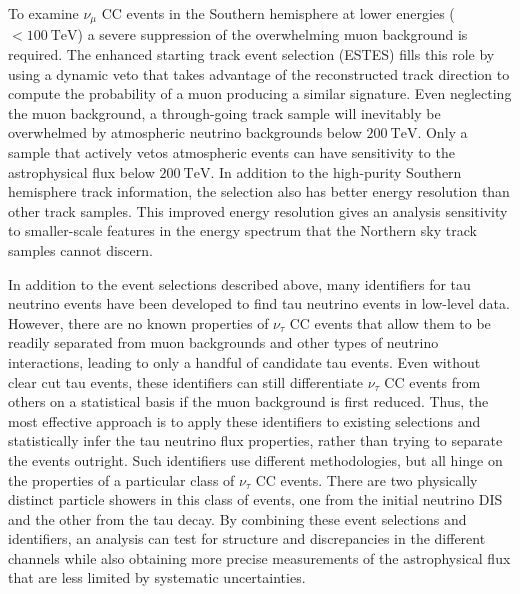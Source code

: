 To examine $\nu_\mu$ CC events in the Southern hemisphere at lower energies ($<\SI{100}\TeV$) a severe suppression of the overwhelming muon background is required.
The enhanced starting track event selection (ESTES) fills this role by using a dynamic veto that takes advantage of the reconstructed track direction to compute the probability of a muon producing a similar signature.
Even neglecting the muon background, a through-going track sample will inevitably be overwhelmed by atmospheric neutrino backgrounds below $\SI{200}\TeV$.
Only a sample that actively vetos atmospheric events can have sensitivity to the astrophysical flux below $\SI{200}\TeV$.
In addition to the high-purity Southern hemisphere track information, the selection also has better energy resolution than other track samples.
This improved energy resolution gives an analysis sensitivity to smaller-scale features in the energy spectrum that the Northern sky track samples cannot discern.

In addition to the event selections described above, many identifiers for tau neutrino events have been developed to find tau neutrino events in low-level data.
However, there are no known properties of $\nu_\tau$ CC events that allow them to be readily separated from muon backgrounds and other types of neutrino interactions, leading to only a handful of candidate tau events.
Even without clear cut tau events, these identifiers can still differentiate $\nu_\tau$ CC events from others on a statistical basis if the muon background is first reduced.
Thus, the most effective approach is to apply these identifiers to existing selections and statistically infer the tau neutrino flux properties, rather than trying to separate the events outright.
Such identifiers use different methodologies, but all hinge on the properties of a particular class of $\nu_\tau$ CC events.
There are two physically distinct particle showers in this class of events, one from the initial neutrino DIS and the other from the tau decay.
By combining these event selections and identifiers, an analysis can test for structure and discrepancies in the different channels while also obtaining more precise measurements of the astrophysical flux that are less limited by systematic uncertainties.

